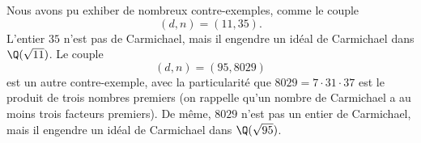 \documentclass[a4paper, 12pt, oneside]{article}
\begin{document}
Nous avons pu exhiber de nombreux contre-exemples, comme le couple $$(d, n) = (11, 35).$$ L'entier $35$ n'est pas de Carmichael, mais il engendre un idéal de Carmichael dans $\Q(\sqrt{11})$. Le couple $$(d, n) = (95,8029)$$ est un autre contre-exemple, avec la particularité que $8029 = 7\cdot 31\cdot 37$ est le produit de trois nombres premiers (on rappelle qu'un nombre de Carmichael a au moins trois facteurs premiers). De même, $8029$ n'est pas un entier de Carmichael, mais il engendre un idéal de Carmichael dans $\Q(\sqrt{95})$.

\nocite{*}
\printbibliography
\end{document}

